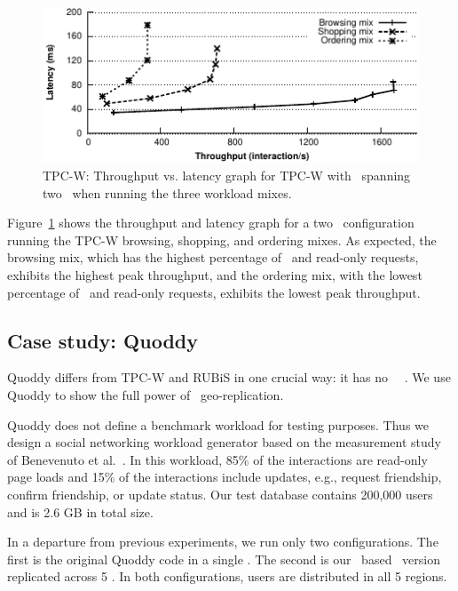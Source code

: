 \begin{figure}[t!]
  \centering
\includegraphics[width=0.85\columnwidth]{figures/redblue/thla2dcTPCWallmixes.pdf}
  \caption{TPC-W: Throughput vs. latency graph for TPC-W with \gemini\ spanning two \dcs\ when running the three workload mixes. }
 \label{fig:tpcw2dcallmixes}
\end{figure}


Figure~\ref{fig:tpcw2dcallmixes} shows the throughput and latency
graph for a two \dc\ configuration running the TPC-W browsing,
shopping, and ordering mixes.  As expected, the browsing mix, which has
the highest percentage of \blue\ and read-only requests, exhibits the
highest peak throughput, and the ordering mix, with the lowest
percentage of \blue\ and read-only requests, exhibits the lowest peak
throughput. 

\subsection{Case study: Quoddy}
Quoddy differs from TPC-W and RUBiS in one crucial way: it has no
\red\ \shadow\ \operations.  We use Quod\-dy to show the full
power of \RedBlue\ geo-rep\-li\-ca\-tion.

Quoddy does not define a benchmark workload for testing purposes.  Thus we
design a social networking workload generator based on the measurement
study of Benevenuto et al.~\cite{Benevenuto2009Character}.  In this
workload, 85\% of the interactions are read-only page loads and 15\% of
the interactions include updates, e.g., request friendship, confirm
friendship, or update status.  Our test database contains 200,000
users and is 2.6 GB in total size.

In a departure from previous experiments, we run only two
configurations.  The first is the original Quoddy code in a
single \dc.  The second is our \gemini\ based \RBct\ version
replicated across 5 \dcs.  In both configurations, users are
distributed in all 5 regions.


